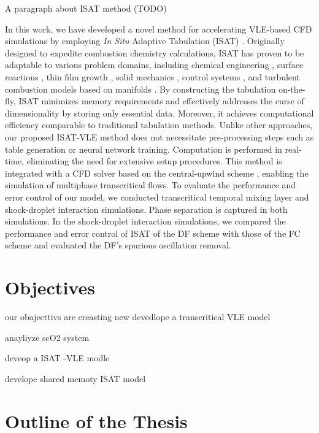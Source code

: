 A paragraph about ISAT method (TODO)

In this work, we have developed a novel method for accelerating VLE-based CFD simulations by employing \textit{In Situ} Adaptive Tabulation (ISAT) \cite{pope1997computationally}. Originally designed to expedite combustion chemistry calculations, ISAT has proven to be adaptable to various problem domains, including chemical engineering \cite{shah1999computational,kolhapure2005pdf,10.1115/1.2709655}, surface reactions \cite{mazumder2005adaptation}, thin film growth \cite{varshney2005multiscale}, solid mechanics \cite{arsenlis2006generalized}, control systems \cite{hedengren2008approximate}, and turbulent combustion models based on manifolds \cite{lacey2021situ}. By constructing the tabulation on-the-fly, ISAT minimizes memory requirements and effectively addresses the curse of dimensionality by storing only essential data. Moreover, it achieves computational efficiency comparable to traditional tabulation methods. Unlike other approaches, our proposed ISAT-VLE method does not necessitate pre-processing steps such as table generation or neural network training. Computation is performed in real-time, eliminating the need for extensive setup procedures. This method is integrated with a CFD solver based on the central-upwind scheme \cite{kurganov2000new,greenshields2010implementation}, enabling the simulation of multiphase transcritical flows. To evaluate the performance and error control of our model, we conducted transcritical temporal mixing layer and shock-droplet interaction simulations. Phase separation is captured in both simulations. In the shock-droplet interaction simulations, we compared the performance and error control of ISAT of the DF scheme with those of the FC scheme and evaluated the DF's spurious oscillation removal. 

\section{Objectives}

our obajecttivs are creasting new devedlope a transcritical VLE model 

anayliyze scO2 system 

deveop a ISAT -VLE modle 

develope shared memoty ISAT model


\section{Outline of the Thesis}





